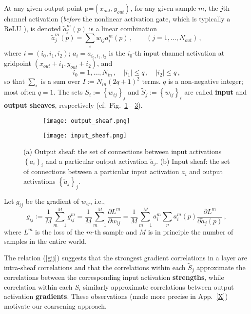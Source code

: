 \documentclass{article} %
\begin{document}
At any given output point p=$(x_{out}, y_{out})$, for any given sample $m$, the $j$th channel activation ({\it before} the nonlinear activation gate, which is typically a ReLU \cite{Goodfellow-et-al-2016}), is denoted $\tilde{a}^m_j(p)$ is a linear combination
\begin{equation}
    \tilde{a}^m_j(p) = \sum_i w_{ij} a^m_i(p)\,,\qquad (j = 1, \dots, N_{out})\,,
    \label{tilde_aj}
\end{equation}
where $i = (i_0, i_1, i_2)$; $a_i = a_{i_0,i_1,i_2}$ is the $i_0$-th input channel activation at gridpoint $(x_{out}+i_1, y_{out}+i_2)$, and
$$
	i_0 = 1, \dots, N_{in}\,, \quad |i_1|\leq q\,,\quad |i_2| \leq q\,,
$$
so that $\sum_i$ is a sum over $I := N_{in} (2 q + 1)^2$ terms. $q$ is a non-negative integer; most often $q = 1$. The sets $S_i := \left\{w_{ij}\right\}_j$ and
$\tilde{S}_j := \left\{w_{ij}\right\}_i$ are called \textbf{input} and \textbf{output sheaves}, respectively (cf.~Fig.~\ref{fig:input_sheaf}--~\ref{fig:output_sheaf}).
\begin{figure}[htbp]
\centering
\begin{subfigure}[b]{0.55\textwidth}
  \texttt{[image: output\_sheaf.png]}
   \caption{}
   \label{fig:input_sheaf} 
\end{subfigure}

\begin{subfigure}[b]{0.55\textwidth}
  \texttt{[image: input\_sheaf.png]}
   \caption{}
   \label{fig:output_sheaf}
\end{subfigure}
\caption[Sheaves.]{(a) Output sheaf: the set of connections between input activations $\left\{a_i\right\}_i$ and a particular output activation $\tilde{a}_j$. (b) Input sheaf: the set of connections between a particular input activation $a_i$ and output activations $\left\{\tilde{a}_j\right\}_j$.}
\end{figure}
Let $g_{ij}$ be the gradient of $w_{ij}$, i.e.,
\begin{equation}
	g_{ij} := \frac{1}{M} \sum_{m=1}^M g^m_{ij} = 
	\frac{1}{M} \sum_{m=1}^M \frac{\partial L^m}{\partial w_{ij}} =
	\frac{1}{M} \sum_{m=1}^M a^m_i \sum_p a^m_i(p) \frac{\partial L^m}{\partial \tilde{a}_j(p)}\,,
	\label{gij}
\end{equation}
where $L^m$ is the loss of the $m$-th sample and $M$ is in principle the number of samples in the entire world. 

The relation (\ref{gij}) suggests that the strongest gradient correlations in a layer are intra-sheaf correlations and that the correlations within each $\tilde{S}_j$ approximate the correlations between the corresponding input activation \textbf{strengths}, while correlation within each $S_i$ similarly approximate correlations between output activation \textbf{gradients}. These observations (made more precise in App.~\ref{X}) motivate our coarsening approach.
\end{document}

